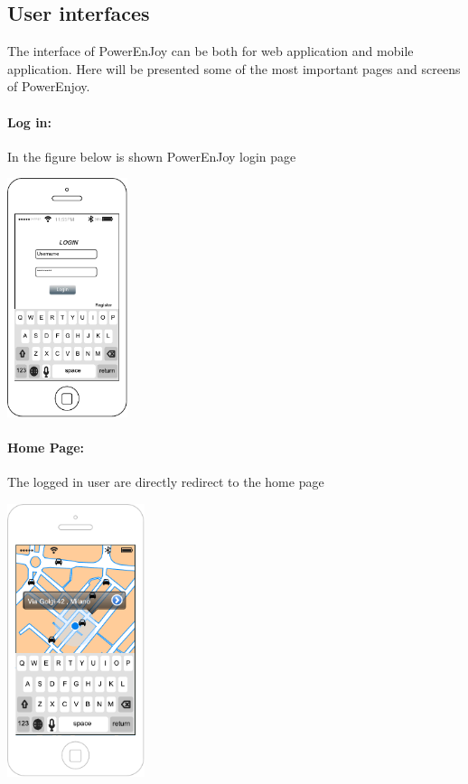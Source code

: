 \subsection{User interfaces}
The interface of PowerEnJoy can be both for web application and mobile application. Here will be presented some of the most important pages and screens of PowerEnjoy.

\paragraph{Log in:}
	In the figure below is shown PowerEnJoy login page
	\begin{center}
		\includegraphics[height=7cm]{Resources/LoginMockup.pdf}
	\end{center}
	
\paragraph{Home Page:}
	The logged in user are directly redirect to the home page
\begin{center}
	\includegraphics[height=8cm]{Resources/MapMockup.pdf}
\end{center}
